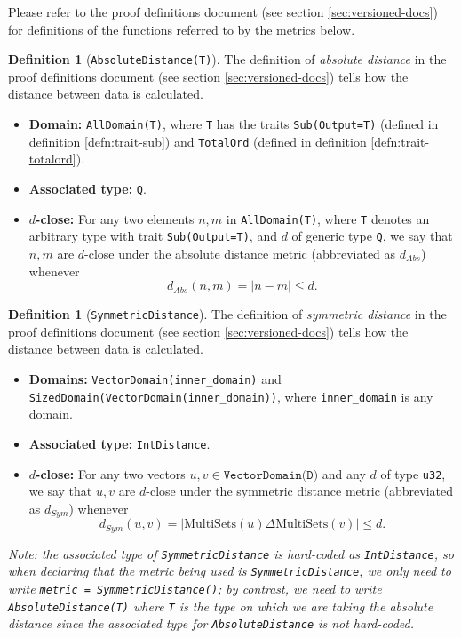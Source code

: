\documentclass[11pt,a4paper]{article}
\theoremstyle{definition}
\newtheorem{definition}[theorem]{Definition}
\newcommand{\MultiSet}{\mathrm{MultiSets}}
\newcommand{\metricDefn}[1]{The definition of \emph{#1} in the proof definitions document (see section \ref{sec:versioned-docs}) tells how the distance between data is calculated.}
\begin{document}
Please refer to the proof definitions document (see section \ref{sec:versioned-docs}) for definitions of the functions referred to by the metrics below.


\begin{definition}[\texttt{AbsoluteDistance(T)}]
\metricDefn{absolute distance}
\begin{itemize}
    \item \textbf{Domain:} \texttt{AllDomain(T)}, where \texttt{T} has the traits \texttt{Sub(Output=T)} (defined in definition \ref{defn:trait-sub}) and \texttt{TotalOrd} (defined in definition \ref{defn:trait-totalord}).
    \item \textbf{Associated type:} \texttt{Q}.
    \item \textbf{$d$-close:} For any two elements $n, m$ in \texttt{AllDomain(T)}, where \texttt{T} denotes an arbitrary type with trait \texttt{Sub(Output=T)}, and $d$ of generic type \texttt{Q}, we say that $n, m$ are $d$-close under the absolute distance metric (abbreviated as $d_{Abs}$) whenever
    \[
        d_{Abs}(n, m) = |n-m| \leq d.
    \]
\end{itemize}
\end{definition}

\begin{definition}[\texttt{SymmetricDistance}]
\metricDefn{symmetric distance} 
\begin{itemize}
    \item \textbf{Domains:} \texttt{VectorDomain(inner\_domain)} and \texttt{SizedDomain(VectorDomain(inner\_domain))}, where \texttt{inner\_domain} is any domain.
    
    \item \textbf{Associated type:} \texttt{IntDistance}.
    \item \textbf{$d$-close:} For any two vectors $u, v \in \texttt{VectorDomain(D)}$ and any $d$ of type \texttt{u32}, we say that $u, v$ are $d$-close under the symmetric distance metric (abbreviated as $d_{Sym}$) whenever 
    \[
        d_{Sym}(u, v) = |\MultiSet(u) \Delta \MultiSet(v)| \leq d.
    \]
\end{itemize}
\end{definition}

\emph{Note: the associated type of \texttt{SymmetricDistance} is hard-coded as \texttt{IntDistance}, so when declaring that the metric being used is \texttt{SymmetricDistance}, we only need to write \texttt{metric = SymmetricDistance()}; by contrast, we need to write \texttt{AbsoluteDistance(T)} where \texttt{T} is the type on which we are taking the absolute distance since the associated type for \texttt{AbsoluteDistance} is not hard-coded.}
\end{document}
